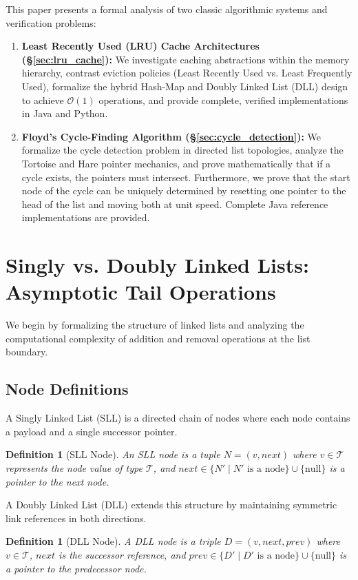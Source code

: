 \documentclass[10pt,journal,compsoc,onecolumn]{IEEEtran}
\newtheorem{definition}[theorem]{Definition}
\begin{document}
This paper presents a formal analysis of two classic algorithmic systems and verification problems:
\begin{enumerate}
    \item \textbf{Least Recently Used (LRU) Cache Architectures (\S\ref{sec:lru_cache}):} We investigate caching abstractions within the memory hierarchy, contrast eviction policies (Least Recently Used vs. Least Frequently Used), formalize the hybrid Hash-Map and Doubly Linked List (DLL) design to achieve $\mathcal{O}(1)$ operations, and provide complete, verified implementations in Java and Python.
    \item \textbf{Floyd's Cycle-Finding Algorithm (\S\ref{sec:cycle_detection}):} We formalize the cycle detection problem in directed list topologies, analyze the Tortoise and Hare pointer mechanics, and prove mathematically that if a cycle exists, the pointers must intersect. Furthermore, we prove that the start node of the cycle can be uniquely determined by resetting one pointer to the head of the list and moving both at unit speed. Complete Java reference implementations are provided.
\end{enumerate}

\section{Singly vs. Doubly Linked Lists: Asymptotic Tail Operations}
\label{sec:linked_lists}

We begin by formalizing the structure of linked lists and analyzing the computational complexity of addition and removal operations at the list boundary.

\subsection{Node Definitions}
A Singly Linked List (SLL) is a directed chain of nodes where each node contains a payload and a single successor pointer.
\begin{definition}[SLL Node]
An SLL node is a tuple $N = (v, \textit{next})$ where $v \in \mathcal{T}$ represents the node value of type $\mathcal{T}$, and $\textit{next} \in \{N' \mid N' \text{ is a node}\} \cup \{\text{null}\}$ is a pointer to the next node.
\end{definition}

A Doubly Linked List (DLL) extends this structure by maintaining symmetric link references in both directions.
\begin{definition}[DLL Node]
A DLL node is a triple $D = (v, \textit{next}, \textit{prev})$ where $v \in \mathcal{T}$, $\textit{next}$ is the successor reference, and $\textit{prev} \in \{D' \mid D' \text{ is a node}\} \cup \{\text{null}\}$ is a pointer to the predecessor node.
\end{definition}
\end{document}
